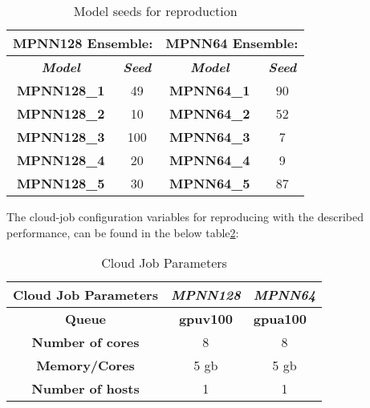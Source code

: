 \begin{table}[H]
    \centering
    \caption{Model seeds for reproduction}
    \label{tab:seeds}
    \begin{tabular}{|cc|cc|}
        \hline
        \multicolumn{2}{|c|}{\textbf{MPNN128 Ensemble:}} & \multicolumn{2}{c|}{\textbf{MPNN64 Ensemble:}}                                                                         \\ \hline
        \multicolumn{1}{|c|}{\textit{\textbf{Model}}}    & \textit{\textbf{Seed}}                         & \multicolumn{1}{c|}{\textit{\textbf{Model}}} & \textit{\textbf{Seed}} \\ \hline
        \multicolumn{1}{|c|}{\textbf{MPNN128\_1}}        & 49                                             & \multicolumn{1}{c|}{\textbf{MPNN64\_1}}      & 90                     \\ \hline
        \multicolumn{1}{|c|}{\textbf{MPNN128\_2}}        & 10                                             & \multicolumn{1}{c|}{\textbf{MPNN64\_2}}      & 52                     \\ \hline
        \multicolumn{1}{|c|}{\textbf{MPNN128\_3}}        & 100                                            & \multicolumn{1}{c|}{\textbf{MPNN64\_3}}      & 7                      \\ \hline
        \multicolumn{1}{|c|}{\textbf{MPNN128\_4}}        & 20                                             & \multicolumn{1}{c|}{\textbf{MPNN64\_4}}      & 9                      \\ \hline
        \multicolumn{1}{|c|}{\textbf{MPNN128\_5}}        & 30                                             & \multicolumn{1}{c|}{\textbf{MPNN64\_5}}      & 87                     \\ \hline
    \end{tabular}
\end{table}

The cloud-job configuration variables for reproducing with the described performance,
can be found in the below table\ref{tab:cloud-job-param}:

\begin{table}[H]
    \centering
    \caption{Cloud Job Parameters}
    \label{tab:cloud-job-param}
    \begin{tabular}{|c|c|c|}
        \hline
        \textbf{Cloud Job Parameters} & \textit{\textbf{MPNN128}} & \textit{\textbf{MPNN64}}              \\ \hline
        \textbf{Queue}                & \textbf{gpuv100}          & \multicolumn{1}{l|}{\textbf{gpua100}} \\ \hline
        \textbf{Number of cores}      & 8                         & 8                                     \\ \hline
        \textbf{Memory/Cores}         & 5 gb                      & 5 gb                                  \\ \hline
        \textbf{Number of hosts}      & 1                         & 1                                     \\ \hline
    \end{tabular}
\end{table}

\newpage
